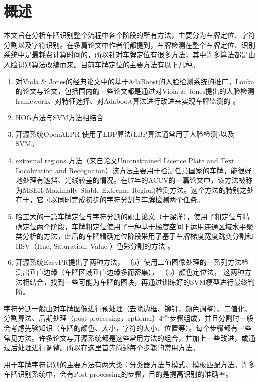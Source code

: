 \section{概述}
本文旨在分析车牌识别整个流程中各个阶段的所有方法，主要分为车牌定位、字符分割以及字符识别。在多篇论文中作者们都提到，车牌检测在整个车牌定位、识别系统中是最耗费计算时间的，所以针对车牌定位有很多方法，其中许多算法都是由人脸识别算法改编而来。目前车牌定位的主要方法有以下几种。
\begin{enumerate}
\item
对Viola \& Jones的经典论文\cite{rrt_face_detection}中的基于AdaBoost的人脸检测系统的推广，Louka的论文\cite{plate_dection_using_adaboost}与论文\cite{rtl_plate_recoginition_on_edsp}，包括国内的一些论文都是通过对Viola \& Jones提出的人脸检测framework、对特征选择、对Adaboost算法进行改进来实现车牌监测的 。
\item
HOG方法与SVM方法相结合
\item
开源系统OpenALPR 使用了LBP算法(LBP算法通常用于人脸检测)以及SVM。
\item
extremal regions 方法（来自论文Unconstrained Licence Plate and Text Localization and Recognition）该方法主要用于检测任意国家的车牌，能很好地处理有遮挡、光线较差的情况。在07年的ACCV的一篇论文中，该方法被称为MSER(Maximally Stable Extremal Region)检测方法。这个方法的特别之处在于，它可以同时完成初步的字符分割与车牌检测两个任务。
\item
哈工大的一篇车牌定位与字符分割的硕士论文（于深洋），使用了粗定位与精确定位两个阶段，车牌粗定位使用了一种基于梯度空间下运用连通区域水平聚类分析的方法，此后的车牌精确定位阶段采用了基于车牌梯度宽度跳变分割和 HSV（Hue, Saturation, Value ）色彩分割的方法 。
\item
开源系统EasyPR提出了两种方法，
（a）使用二值图像处理的一系列方法检测出垂直边缘（车牌区域垂直边缘多而密集），
（b）颜色定位法，
这两种方法相结合，找到一些可能为车牌的图块，再通过训练好的SVM模型进行最终判断。
\end{enumerate}
字符分割一般由对车牌图像进行预处理（去除边框、铆钉，颜色调整）、二值化、分割算法、后期处理（post-processing，optional）4个步骤组成，并且分割时一般会考虑先验知识（车牌的颜色、大小，字符的大小、位置等）。每个步骤都有一些常见方法。许多论文与开源系统都是这些常用方法的组合，并加上一些改进，或通过后处理进行调整。所以在这里首先简述每个步骤的常用方法。

用于车牌字符识别的主要方法有两大类：分类器方法与模式、模板匹配方法。许多车牌识别系统中，会有Post processing的步骤，目的是提高识别的准确率。